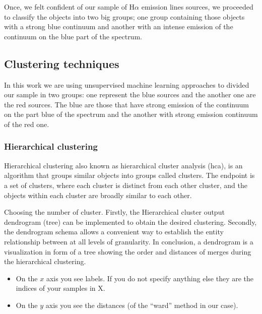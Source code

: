 \documentclass[fleqn,usenatbib]{mnras}
\begin{document}
Once, we felt confident of our sample of H{$\alpha$} emission lines sources,
we proceeded to classify the objects into two big groups; one group containing those
objects with a strong blue continuum and another with an intense emission of the
continuum on the blue part of the spectrum. 


\subsection{Clustering techniques}
\label{sec:clustering}

In this work we are using unsupervised machine learning approaches to divided our sample
in two groups: one represent the blue sources and the another one are the red sources.
The blue are those that have strong emission of the continuum on the part blue of the
spectrum and the another with strong emission continuum of the red one. 

\subsubsection{Hierarchical clustering}
\label{sec:Hierar}

Hierarchical clustering also known as hierarchical cluster analysis ({\sc hca}),
is an algorithm that groups similar objects into groups called clusters.
The endpoint is a set of clusters, where each cluster is distinct from each
other cluster, and the objects within each cluster are broadly similar to each other.

Choosing the number of cluster. Firstly, the Hierarchical cluster output dendrogram (tree)
can be implemented to obtain the desired clustering. Secondly, the dendrogram schema  allows
a convenient way to establish the entity relationship between at all levels of granularity.
In conclusion, a dendrogram is a visualization in form of a tree showing the order
and distances of merges during the hierarchical clustering.

\begin{itemize}
  
     \item On the $x$ axis you see labels. If you do not specify anything else they
       are the indices of your samples in X.
     \item On the $y$ axis you see the distances (of the ``ward'' method in our case).
       
\end{itemize}


\end{document}
